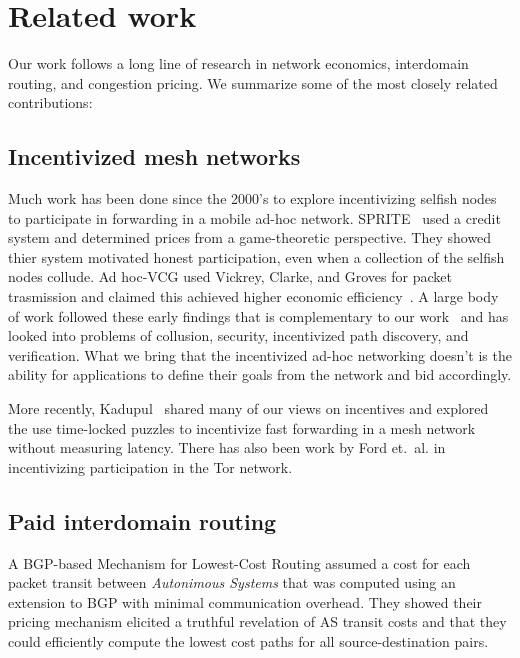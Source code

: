 \section{Related work}
\label{sec:related}

Our work follows a long line of research in network economics,
interdomain routing, and congestion pricing.  We summarize some of the
most closely related contributions:

\subsection{Incentivized mesh networks}
Much work has been done since the 2000's to explore incentivizing selfish nodes to participate in forwarding in a mobile ad-hoc network.
SPRITE~\cite{zhong03} used a credit system and determined prices from a game-theoretic perspective. They showed thier system motivated honest participation, even when a collection of the selfish nodes collude. Ad hoc-VCG used Vickrey, Clarke, and Groves for packet trasmission and claimed this achieved higher economic efficiency~\cite{anderegg03}.
A large body of work followed these early findings that is complementary to our work~\cite{buttyan03,chen04, chen05, wang06, demir07,zhong07, kargar08, zhu08, eidenbenz08, wu10, zhong10, martignon11, martignon15, chen13} and has looked into problems of collusion, security, incentivized path discovery, and verification. What we bring that the incentivized ad-hoc networking doesn't is the ability for applications to define their goals from the network and bid accordingly.

More recently, Kadupul~\cite{kadupul15} shared many of our views on incentives and explored the use time-locked puzzles to incentivize fast forwarding in a mesh network without measuring latency.
There has also been work by Ford et.~al. in incentivizing participation in the Tor network\cite{torpath14, onions14}.

\subsection{Paid interdomain routing}
A BGP-based Mechanism for Lowest-Cost Routing \cite{feigenbaum05} assumed a cost for each packet transit between \emph{Autonimous Systems} that was computed using an extension to BGP with minimal communication overhead. They showed their pricing mechanism elicited a truthful revelation of AS transit costs and that they could efficiently compute the lowest cost paths for all source-destination pairs.

